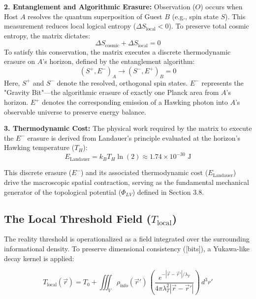 \documentclass[12pt,a4paper]{article}
\begin{document}
\textbf{2. Entanglement and Algorithmic Erasure:}
Observation ($O$) occurs when Host $A$ resolves the quantum superposition of Guest $B$ (e.g., spin state $S$). This measurement reduces local logical entropy ($\Delta S_{\mathrm{local}} < 0$). To preserve total cosmic entropy, the matrix dictates:
\begin{equation}
\Delta S_{\mathrm{cosmic}} + \Delta S_{\mathrm{local}} = 0
\end{equation}
To satisfy this conservation, the matrix executes a discrete thermodynamic erasure on $A$'s horizon, defined by the entanglement algorithm:
\begin{equation}
(S^{+}, E^{-})_A \rightarrow (S^{-}, E^{+})_B = 0
\end{equation}
Here, $S^{+}$ and $S^{-}$ denote the resolved, orthogonal spin states. $E^{-}$ represents the "Gravity Bit"---the algorithmic erasure of exactly one Planck area from $A$'s horizon. $E^{+}$ denotes the corresponding emission of a Hawking photon into $A$'s observable universe to preserve energy balance.

\textbf{3. Thermodynamic Cost:}
The physical work required by the matrix to execute the $E^{-}$ erasure is derived from Landauer's principle evaluated at the horizon's Hawking temperature ($T_H$):
\begin{equation}
E_{\mathrm{Landauer}} = k_B T_H \ln(2) \approx 1.74 \times 10^{-30} \text{ J}
\end{equation}

This discrete erasure ($E^{-}$) and its associated thermodynamic cost ($E_{\mathrm{Landauer}}$) drive the macroscopic spatial contraction, serving as the fundamental mechanical generator of the topological potential ($\Phi_{LV}$) defined in Section 3.8.



\subsection{The Local Threshold Field ($T_{\mathrm{local}}$)}
The reality threshold is operationalized as a field integrated over the surrounding informational density. To preserve dimensional consistency ([bits]), a Yukawa-like decay kernel is applied:

\begin{equation}\label{eq:T_local}
T_{\mathrm{local}}(\vec{r}) = T_0 + \iiint_{V} \rho_{\mathrm{info}}(\vec{r}') \, \left( \frac{e^{-|\vec{r}-\vec{r}'|/\lambda_T}}{4\pi \lambda_T^2 |\vec{r}-\vec{r}'|} \right) \, d^3r'
\end{equation}
\end{document}
